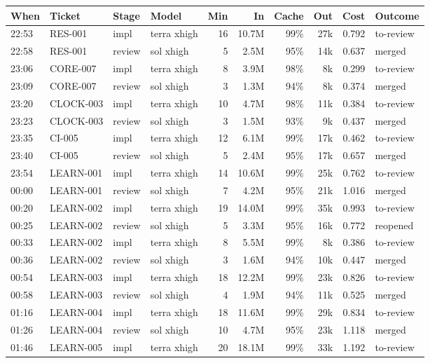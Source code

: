 \documentclass[11pt,a4paper]{article}
\begin{document}
{\scriptsize
\setlength\tabcolsep{3pt}
\begin{longtable}{@{}llllrrrrrl@{}}
\toprule
When & Ticket & Stage & Model & Min & In & Cache & Out & Cost & Outcome \\
\midrule
\endhead
22:53 & RES-001 & impl & terra xhigh & 16 & 10.7M & 99\% & 27k & 0.792 & to-review \\
22:58 & RES-001 & review & sol xhigh & 5 & 2.5M & 95\% & 14k & 0.637 & merged \\
23:06 & CORE-007 & impl & terra xhigh & 8 & 3.9M & 98\% & 8k & 0.299 & to-review \\
23:09 & CORE-007 & review & sol xhigh & 3 & 1.3M & 94\% & 8k & 0.374 & merged \\
23:20 & CLOCK-003 & impl & terra xhigh & 10 & 4.7M & 98\% & 11k & 0.384 & to-review \\
23:23 & CLOCK-003 & review & sol xhigh & 3 & 1.5M & 93\% & 9k & 0.437 & merged \\
23:35 & CI-005 & impl & terra xhigh & 12 & 6.1M & 99\% & 17k & 0.462 & to-review \\
23:40 & CI-005 & review & sol xhigh & 5 & 2.4M & 95\% & 17k & 0.657 & merged \\
23:54 & LEARN-001 & impl & terra xhigh & 14 & 10.6M & 99\% & 25k & 0.762 & to-review \\
00:00 & LEARN-001 & review & sol xhigh & 7 & 4.2M & 95\% & 21k & 1.016 & merged \\
00:20 & LEARN-002 & impl & terra xhigh & 19 & 14.0M & 99\% & 35k & 0.993 & to-review \\
00:25 & LEARN-002 & review & sol xhigh & 5 & 3.3M & 95\% & 16k & 0.772 & reopened \\
00:33 & LEARN-002 & impl & terra xhigh & 8 & 5.5M & 99\% & 8k & 0.386 & to-review \\
00:36 & LEARN-002 & review & sol xhigh & 3 & 1.6M & 94\% & 10k & 0.447 & merged \\
00:54 & LEARN-003 & impl & terra xhigh & 18 & 12.2M & 99\% & 23k & 0.826 & to-review \\
00:58 & LEARN-003 & review & sol xhigh & 4 & 1.9M & 94\% & 11k & 0.525 & merged \\
01:16 & LEARN-004 & impl & terra xhigh & 18 & 11.6M & 99\% & 29k & 0.834 & to-review \\
01:26 & LEARN-004 & review & sol xhigh & 10 & 4.7M & 95\% & 23k & 1.118 & merged \\
01:46 & LEARN-005 & impl & terra xhigh & 20 & 18.1M & 99\% & 33k & 1.192 & to-review \\

\end{longtable}}
\end{document}
